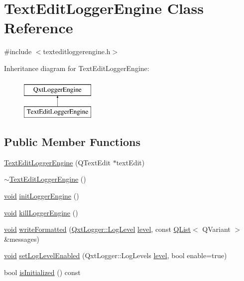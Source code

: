 \hypertarget{class_text_edit_logger_engine}{\section{Text\-Edit\-Logger\-Engine Class Reference}
\label{class_text_edit_logger_engine}
}


{\ttfamily \#include $<$texteditloggerengine.\-h$>$}

Inheritance diagram for Text\-Edit\-Logger\-Engine\-:\begin{figure}[H]
\begin{center}
\leavevmode
\includegraphics[height=2.000000cm]{class_text_edit_logger_engine}
\end{center}
\end{figure}
\subsection*{Public Member Functions}
\begin{DoxyCompactItemize}
\item 
\hyperlink{group___console_plugin_gaf57b0c5ea1591a2931695b3e58c8d298}{Text\-Edit\-Logger\-Engine} (Q\-Text\-Edit $\ast$text\-Edit)
\item 
\hyperlink{group___console_plugin_gaf9f579c5f0cbb1b08f7fcd3bd30f8964}{$\sim$\-Text\-Edit\-Logger\-Engine} ()
\item 
\hyperlink{group___u_a_v_objects_plugin_ga444cf2ff3f0ecbe028adce838d373f5c}{void} \hyperlink{group___console_plugin_gad4e7c7170672faefa715053b281859c2}{init\-Logger\-Engine} ()
\item 
\hyperlink{group___u_a_v_objects_plugin_ga444cf2ff3f0ecbe028adce838d373f5c}{void} \hyperlink{group___console_plugin_ga54411c88e44357048e786fb83d2abb21}{kill\-Logger\-Engine} ()
\item 
\hyperlink{group___u_a_v_objects_plugin_ga444cf2ff3f0ecbe028adce838d373f5c}{void} \hyperlink{group___console_plugin_ga2a9c1df4120a7ceeb25bafac4682e695}{write\-Formatted} (\hyperlink{class_qxt_logger_ac2071072628aa786466124cc32a324e7}{Qxt\-Logger\-::\-Log\-Level} \hyperlink{glext_8h_abc60a79088789bd61297bf5f9ff500d1}{level}, const \hyperlink{class_q_list}{Q\-List}$<$ Q\-Variant $>$ \&messages)
\item 
\hyperlink{group___u_a_v_objects_plugin_ga444cf2ff3f0ecbe028adce838d373f5c}{void} \hyperlink{group___console_plugin_ga45c5e0aeca53547cd9b538c3cd428689}{set\-Log\-Level\-Enabled} (Qxt\-Logger\-::\-Log\-Levels \hyperlink{glext_8h_abc60a79088789bd61297bf5f9ff500d1}{level}, bool enable=true)
\item 
bool \hyperlink{group___console_plugin_gaaf31edb9cfde3ba4fca139b77f04c0a5}{is\-Initialized} () const 
\end{DoxyCompactItemize}


